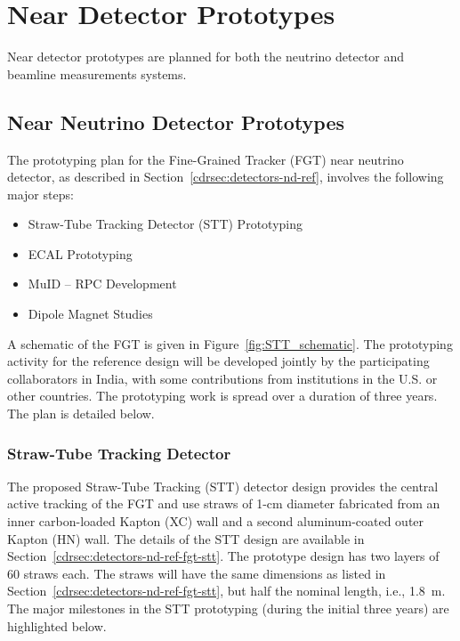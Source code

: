 
\section{Near Detector Prototypes}
\label{sec:proto-nd}
Near detector prototypes are planned for both the neutrino detector and beamline measurements systems.

\subsection{Near Neutrino Detector Prototypes}
\label{sec:proto-nd-nnd}
The prototyping plan for the Fine-Grained Tracker (FGT) near neutrino
detector, as described in Section~\ref{cdrsec:detectors-nd-ref},
involves the following major steps:
\begin{itemize}
\item Straw-Tube Tracking Detector (STT) Prototyping
\item ECAL Prototyping
\item MuID -- RPC Development
\item Dipole Magnet Studies
\end{itemize}

A schematic of the FGT is given in Figure~\ref{fig:STT_schematic}. The
prototyping activity for the reference design will be developed
jointly by the participating collaborators in India, with some
contributions from institutions in the U.S. or other countries.  The
prototyping work is spread over a duration of three years. The plan is
detailed below.

\subsubsection{Straw-Tube Tracking Detector}

The proposed Straw-Tube Tracking (STT) detector design
provides the central active tracking of the FGT and use straws of
1-cm diameter fabricated from an inner carbon-loaded Kapton (XC) wall
and a second aluminum-coated outer Kapton (HN) wall. The details of the
STT design are available in
Section~\ref{cdrsec:detectors-nd-ref-fgt-stt}. The prototype design
has two layers of 60 straws each.  The straws will have the
same dimensions as listed in
Section~\ref{cdrsec:detectors-nd-ref-fgt-stt}, but half the nominal
length, i.e., 1.8~m. The major milestones in the STT prototyping
(during the initial three years) are highlighted below.

